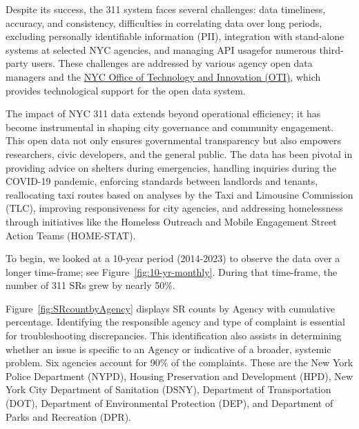 \documentclass[12pt, titlepage]{article}
\begin{document}
Despite its success, the 311 system faces several challenges:
data timeliness, accuracy, and consistency, difficulties in
correlating data over long periods, excluding personally
identifiable information (PII), integration with stand-alone systems
at selected NYC agencies, and managing API usagefor numerous
third-party users. These challenges are addressed by various agency
open data managers and the
\href{https://www.nyc.gov/content/oti/pages/}{NYC Office of Technology
  and Innovation (OTI)}, which provides technological support for the
open data system. 


The impact of NYC 311 data extends beyond operational efficiency; it
has become instrumental in shaping city governance and community
engagement. This open data not only ensures governmental transparency
but also empowers researchers, civic developers, and the general
public. The data has been pivotal in providing advice on shelters
during emergencies, handling inquiries during the COVID-19 pandemic,
enforcing standards between landlords and tenants, reallocating taxi
routes based on analyses by the Taxi and Limousine Commission (TLC),
improving responsiveness for city agencies, and addressing 
homelessness through initiatives like the Homeless
Outreach and Mobile Engagement Street Action Teams (HOME-STAT). 

To begin, we looked at a 10-year period (2014-2023) to
observe the data over a longer time-frame; see
Figure~\ref{fig:10-yr-monthly}. During that time-frame,
the number of 311 SRs grew by nearly 50\%.





Figure~\ref{fig:SRcountbyAgency} displays SR counts by Agency with
cumulative percentage. Identifying the 
responsible agency and type of complaint is essential 
for troubleshooting discrepancies. 
This identification also assists in determining whether an issue is 
specific to an Agency or indicative of a broader, systemic problem. 
Six agencies account for 90\% of the complaints. These are the New York
Police Department (NYPD), Housing Preservation and Development (HPD),
New York City Department of Sanitation (DSNY), Department of
Transportation (DOT), Department of Environmental Protection (DEP),
and Department of Parks and Recreation (DPR).
\end{document}
